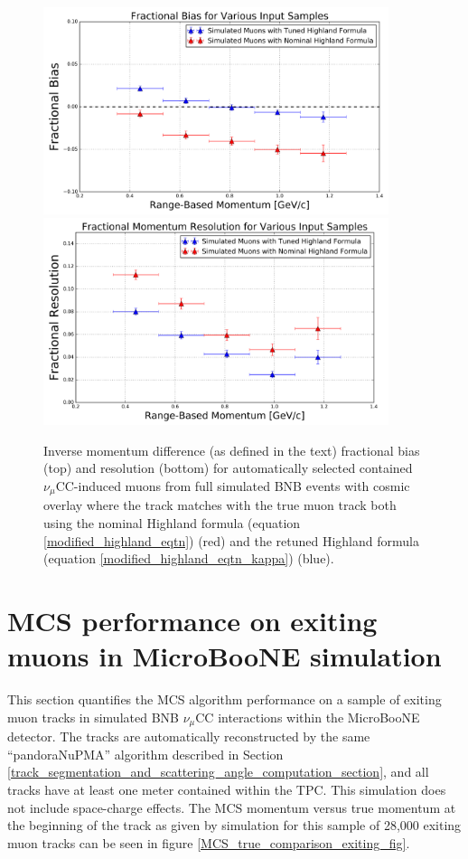 \documentclass[a4paper,11pt]{article}
\begin{document}
\begin{figure}
\centering
	\includegraphics[width=0.9\textwidth]{Figures/MCS_range_bias_compareHighlandTuning_publicplot.png}
	\includegraphics[width=0.9\textwidth]{Figures/MCS_range_resolution_compareHighlandTuning_publicplot.png}
\caption{Inverse momentum difference (as defined in the text) fractional bias (top) and resolution (bottom) for automatically selected contained $\nu_\mu$CC-induced muons from full simulated BNB events with cosmic overlay where the track matches with the true muon track both using the nominal Highland formula (equation \ref{modified_highland_eqtn}) (red) and the retuned Highland formula (equation \ref{modified_highland_eqtn_kappa}) (blue).}\label{MCS_range_bias_resolution_compareHighlandFormulas_fig}
\end{figure}






\section{MCS performance on exiting muons in MicroBooNE simulation}
This section quantifies the MCS algorithm performance on a sample of exiting muon tracks in simulated BNB $\nu_\mu$CC interactions within the MicroBooNE detector. The tracks are automatically reconstructed by the same ``pandoraNuPMA'' algorithm described in Section \ref{track_segmentation_and_scattering_angle_computation_section}, and all tracks have at least one meter contained within the TPC. This simulation does not include space-charge effects. The MCS momentum versus true momentum at the beginning of the track as given by simulation for this sample of 28,000 exiting muon tracks can be seen in figure \ref{MCS_true_comparison_exiting_fig}.\\
\end{document}
